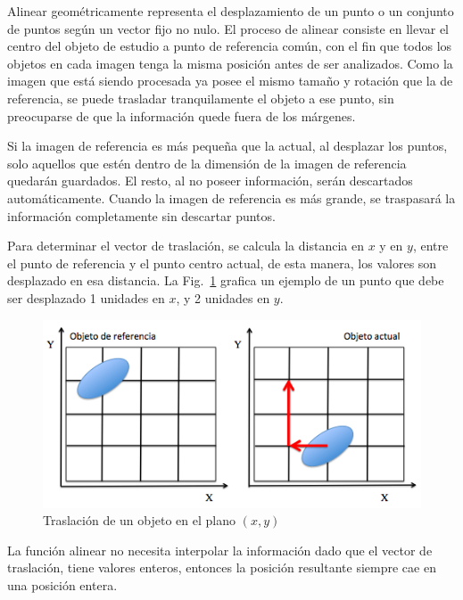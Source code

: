Alinear geométricamente representa el desplazamiento de un punto o un
conjunto de puntos según un vector fijo no nulo. El proceso de alinear
consiste en llevar el centro del objeto de estudio a punto de
referencia común, con el fin que todos los objetos en cada imagen
tenga la misma posición antes de ser analizados. Como la imagen que
está siendo procesada ya posee el mismo tamaño y rotación que la de
referencia, se puede trasladar tranquilamente el objeto a ese punto,
sin preocuparse de que la información quede fuera de los márgenes.

Si la imagen de referencia es más pequeña que la actual, al desplazar
los puntos, solo aquellos que estén dentro de la dimensión de la
imagen de referencia quedarán guardados. El resto, al no poseer
información, serán descartados automáticamente. Cuando la imagen de
referencia es más grande, se traspasará la información completamente
sin descartar puntos.

Para determinar el vector de traslación, se calcula la distancia en
$x$ y en $y$, entre el punto de referencia y el punto centro actual,
de esta manera, los valores son desplazado en esa distancia. La
Fig.~\ref{img:puntoDesplazado} grafica un ejemplo de un punto que debe
ser desplazado 1 unidades en $x$, y 2 unidades en $y$.

\begin{figure}[hb!]
  \begin{center}
    \includegraphics[scale=.5]{image/pd}
  \end{center}
  \caption{Traslación de un objeto en el plano $(x,y)$}\label{img:puntoDesplazado}
\end{figure}

La función alinear no necesita interpolar la información dado que el
vector de traslación, tiene valores enteros, entonces la posición
resultante siempre cae en una posición entera.

